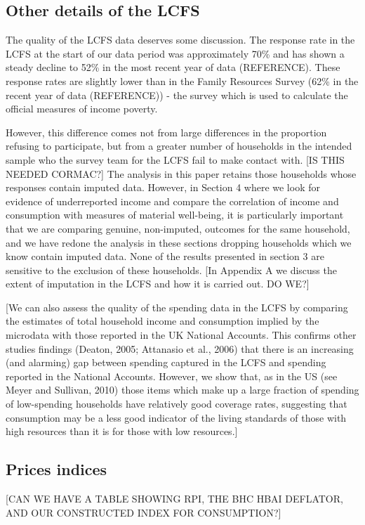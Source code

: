 \subsection{Other details of the LCFS}
The quality of the LCFS data deserves some discussion.
 The response rate in the LCFS at the start of our data period was approximately
 70\% and has shown a steady decline to 52\% in the most recent year of data
 (REFERENCE).  These response rates are slightly lower than in the Family Resources Survey
 (62\% in the recent year of data (REFERENCE)) - the survey which is used to calculate the official measures of income poverty.

However, this difference comes not from large differences in the proportion refusing to participate, but from a greater number of households in the
 intended sample who the survey team for the LCFS fail to make contact with.
[IS THIS NEEDED CORMAC?] The analysis in this paper retains those households whose responses contain imputed data.  However, in Section 4 where we look for evidence of underreported income and compare the correlation of income and consumption with measures of material well-being, it is particularly important that we are comparing genuine, non-imputed, outcomes for the same household, and we have redone the analysis in these sections dropping households which we know contain imputed data. None of the results presented in section 3 are sensitive to the exclusion of these households. [In Appendix A we discuss the extent of imputation in the LCFS and how it is carried out. DO WE?]

[We can also assess the quality of the spending data in the LCFS by comparing the estimates of total household income and consumption implied by the microdata with those reported in the UK National Accounts. This confirms other studies findings (Deaton, 2005; Attanasio et al., 2006) that there is an increasing (and alarming) gap between spending captured in the LCFS and spending reported in the National Accounts. However, we show that, as in the US (see Meyer and Sullivan, 2010) those items which make up a large fraction of spending of low-spending households have relatively good coverage rates, suggesting that consumption may be a less good indicator of the living standards of those with high resources than it is for those with low resources.]

\subsection{Prices indices}
[CAN WE HAVE A TABLE SHOWING RPI, THE BHC HBAI DEFLATOR, AND OUR CONSTRUCTED INDEX FOR CONSUMPTION?]

